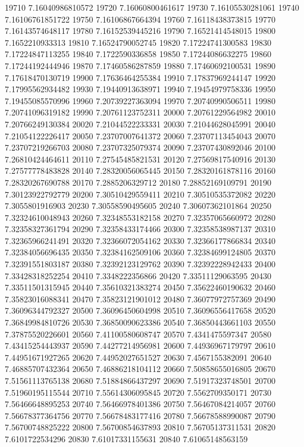 {19710 7.16040986810572
19720 7.16060800461617
19730 7.16105530281061
19740 7.16106761851722
19750 7.16106867664394
19760 7.16118438373815
19770 7.16143574648117
19780 7.16152539445216
19790 7.16521414548015
19800 7.1652210933313
19810 7.16524790052745
19820 7.17224741300583
19830 7.17224847113255
19840 7.1722590336858
19850 7.17244086632275
19860 7.17244192444946
19870 7.17460586287859
19880 7.17460692100531
19890 7.17618470130719
19900 7.17636464255384
19910 7.17837969244147
19920 7.17995562934482
19930 7.19440913638971
19940 7.19454979758336
19950 7.19455085570996
19960 7.20739227363094
19970 7.20740990506511
19980 7.20741096319182
19990 7.20761123752311
20000 7.20761229564982
20010 7.20766249130384
20020 7.21044522233331
20030 7.21044628045991
20040 7.21054122226417
20050 7.23707007641372
20060 7.23707113454043
20070 7.23707219266703
20080 7.23707325079374
20090 7.23707430892046
20100 7.26810424464611
20110 7.27545485821531
20120 7.27569817540916
20130 7.27577778483828
20140 7.28320056065445
20150 7.28320161878116
20160 7.28320267690788
20170 7.2885206329712
20180 7.28852169109791
20190 7.30123922792779
20200 7.30510429559411
20210 7.30510535372082
20220 7.3055801916903
20230 7.30558590495605
20240 7.30607362101864
20250 7.32324610048943
20260 7.32348553182158
20270 7.32357065660972
20280 7.32358327361794
20290 7.32358433174466
20300 7.32358538987137
20310 7.32365966241491
20320 7.32366072054162
20330 7.32366177866834
20340 7.32384056696435
20350 7.32384162509106
20360 7.32384699124805
20370 7.32391551803187
20380 7.32392123129762
20390 7.32392228942433
20400 7.33428318252254
20410 7.3348222356866
20420 7.33511129063595
20430 7.33511501315945
20440 7.35610321383274
20450 7.35622460190632
20460 7.35823016088341
20470 7.35823121901012
20480 7.36077972757369
20490 7.36096344792327
20500 7.36096450604998
20510 7.36096556417658
20520 7.36849984810726
20530 7.36850090623386
20540 7.36850443661103
20550 7.37875520226601
20560 7.41100580608747
20570 7.4341475597347
20580 7.43415254443937
20590 7.44277214956981
20600 7.44936967179797
20610 7.44951671927265
20620 7.44952027651527
20630 7.4567155382091
20640 7.46885707432364
20650 7.46886218104112
20660 7.50858655016805
20670 7.51561113765138
20680 7.51884866437297
20690 7.51917323748501
20700 7.51960195115544
20710 7.55614306095845
20720 7.5562709350171
20730 7.56466648895253
20740 7.56466978401386
20750 7.56467084214057
20760 7.56678377364756
20770 7.56678483177416
20780 7.56678588990087
20790 7.56700748825222
20800 7.56700854637893
20810 7.56705137311531
20820 7.6101722534296
20830 7.61017331155631
20840 7.61065148563159
}
